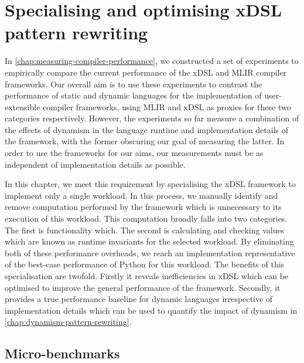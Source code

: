 \chapter{Specialising and optimising xDSL pattern rewriting}
\label{chap:specialising-optimising-pattern-rewriting}

In \autoref{chap:measuring-compiler-performance}, we constructed a set of experiments to empirically compare the current performance of the xDSL and MLIR compiler frameworks.
Our overall aim is to use these experiments to contrast the performance of static and dynamic languages for the implementation of user-extensible compiler frameworks, using MLIR and xDSL as proxies for these two categories respectively.
However, the experiments so far measure a combination of the effects of dynamism in the language runtime and implementation details of the framework, with the former obscuring our goal of measuring the latter.
In order to use the frameworks for our aims, our measurements must be as independent of implementation details as possible.

In this chapter, we meet this requirement by specialising the xDSL framework to implement only a single workload.
In this process, we manually identify and remove computation performed by the framework which is unnecessary to its execution of this workload. This computation broadly falls into two categories. The first is functionality which. %
The second is calculating and checking values which are known as runtime invariants for the selected workload. %
By eliminating both of these performance overheads, we reach an implementation representative of the best-case performance of Python for this workload.
The benefits of this specialisation are twofold. Firstly it reveals inefficiencies in xDSL which can be optimised to improve the general performance of the framework. Secondly, it provides a true performance baseline for dynamic languages irrespective of implementation details which can be used to quantify the impact of dynamism in \autoref{chap:dynamism-pattern-rewriting}.


\section{Micro-benchmarks}
\label{sec:specialising-ubenchmarks}

